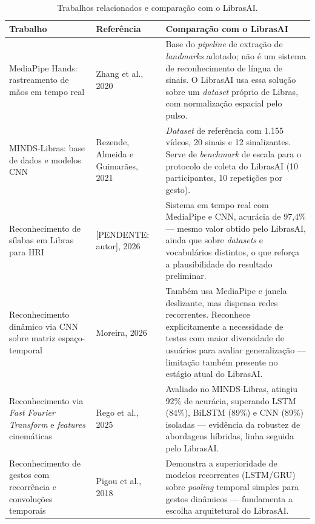 \begin{table}[htbp]
\centering
\caption{Trabalhos relacionados e comparação com o LibrasAI.}
\label{tab:relacionados}
\small
\begin{tabular}{@{}p{3.2cm} p{2.6cm} p{6.4cm}@{}}
\toprule
\textbf{Trabalho} & \textbf{Referência} & \textbf{Comparação com o LibrasAI} \\
\midrule
MediaPipe Hands: rastreamento de mãos em tempo real &
Zhang et al., 2020 &
Base do \textit{pipeline} de extração de \textit{landmarks} adotado; não é um
sistema de reconhecimento de língua de sinais. O LibrasAI usa essa solução sobre
um \textit{dataset} próprio de Libras, com normalização espacial pelo pulso. \\
\addlinespace
MINDS-Libras: base de dados e modelos CNN &
Rezende, Almeida e Guimarães, 2021 &
\textit{Dataset} de referência com 1.155 vídeos, 20 sinais e 12 sinalizantes.
Serve de \textit{benchmark} de escala para o protocolo de coleta do LibrasAI (10
participantes, 10 repetições por gesto). \\
\addlinespace
Reconhecimento de sílabas em Libras para HRI &
[PENDENTE: autor], 2026 &
Sistema em tempo real com MediaPipe e CNN, acurácia de 97,4\% — mesmo valor
obtido pelo LibrasAI, ainda que sobre \textit{datasets} e vocabulários distintos,
o que reforça a plausibilidade do resultado preliminar. \\
\addlinespace
Reconhecimento dinâmico via CNN sobre matriz espaço-temporal &
Moreira, 2026 &
Também usa MediaPipe e janela deslizante, mas dispensa redes recorrentes.
Reconhece explicitamente a necessidade de testes com maior diversidade de
usuários para avaliar generalização — limitação também presente no estágio atual
do LibrasAI. \\
\addlinespace
Reconhecimento via \textit{Fast Fourier Transform} e \textit{features}
cinemáticas &
Rego et al., 2025 &
Avaliado no MINDS-Libras, atingiu 92\% de acurácia, superando LSTM (84\%), BiLSTM
(89\%) e CNN (89\%) isoladas — evidência da robustez de abordagens híbridas,
linha seguida pelo LibrasAI. \\
\addlinespace
Reconhecimento de gestos com recorrência e convoluções temporais &
Pigou et al., 2018 &
Demonstra a superioridade de modelos recorrentes (LSTM/GRU) sobre \textit{pooling}
temporal simples para gestos dinâmicos — fundamenta a escolha arquitetural do
LibrasAI. \\
\bottomrule
\end{tabular}
\end{table}
